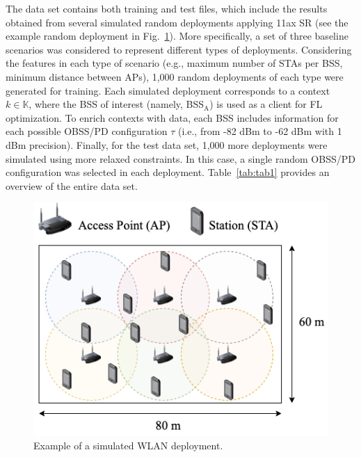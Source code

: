 \documentclass[10pt,a4paper,twocolumn]{article}
\newcommand{\ITUpar}{\vspace{8pt}\par}
\def\startfigure{\vspace{6pt}\begin{figure}[ht]\center}
\begin{document}
The data set contains both training and test files, which include the results obtained from several simulated random deployments applying 11ax SR (see the example random deployment in Fig.~\ref{fig:simulation_scenario}). More specifically, a set of three baseline scenarios was considered to represent different types of deployments. Considering the features in each type of scenario (e.g., maximum number of STAs per BSS, minimum distance between APs), 1,000 random deployments of each type were generated for training. Each simulated deployment corresponds to a context $k\in \mathbb{K}$, where the BSS of interest (namely, BSS$_\text{A}$) is used as a client for FL optimization. To enrich contexts with data, each BSS includes information for each possible OBSS/PD configuration $\tau$ (i.e., from -82 dBm to -62 dBm with 1 dBm precision). Finally, for the test data set, 1,000 more deployments were simulated using more relaxed constraints. In this case, a single random OBSS/PD configuration was selected in each deployment. Table~\ref{tab:tab1} provides an overview of the entire data set.\ITUpar

\startfigure
\includegraphics[width=.8\columnwidth]{img/simulation_scenario}
\caption{Example of a simulated WLAN deployment.}\label{fig:simulation_scenario} 
\end{figure}
\end{document}
